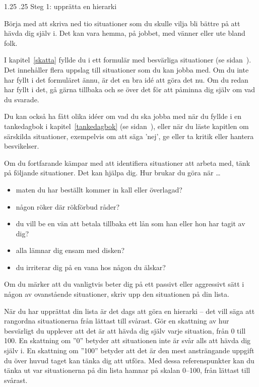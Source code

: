 \documentclass[swedish,a4paper]{book}
\makeatletter
\renewcommand\section{\@startsection{section}{1}{\z@}%
                                   {1.25\baselineskip}%
                                   {.25\baselineskip}%
                                   {\fontsize{1.25\baselineskip}{1.25\baselineskip}\selectfont\sffamily\bfseries}} %
\makeatother
\begin{document}
\section{Steg 1: upprätta en hierarki}

Börja med att skriva ned tio situationer som du skulle vilja bli bättre på att hävda dig själv i. Det kan vara hemma, på jobbet, med vänner eller ute bland folk.

I kapitel~\ref{skatta} fyllde du i ett formulär med besvärliga situationer (se sidan~\pageref{exercise1}). Det innehåller flera uppslag till situationer som du kan jobba med. Om du inte har fyllt i det formuläret ännu, är det en bra idé att göra det nu. Om du redan har fyllt i det, gå gärna tillbaka och se över det för att påminna dig själv om vad du svarade.

Du kan också ha fått olika idéer om vad du ska jobba med när du fyllde i en tankedagbok i kapitel~\ref{tankedagbok} (se sidan~\pageref{tankedagbok}), eller när du läste kapitlen om särskilda situationer, exempelvis om att säga 'nej', ge eller ta kritik eller hantera besvikelser.

Om du fortfarande kämpar med att identifiera situationer att arbeta med, tänk på följande situationer. Det kan hjälpa dig. Hur brukar du göra när \ldots{}

\begin{itemize}

\item maten du har beställt kommer in kall eller överlagad?

\item någon röker där rökförbud råder?

\item du vill be en vän att betala tillbaka ett lån som han eller hon har tagit av dig?

\item alla lämnar dig ensam med disken?

\item du irriterar dig på en vana hos någon du älskar?

\end{itemize}

Om du märker att du vanligtvis beter dig på ett passivt eller aggressivt sätt i någon av ovanstående situationer, skriv upp den situationen på din lista.

När du har upprättat din lista är det dags att göra en hierarki -- det vill säga att rangordna situationerna från lättast till svårast. Gör en skattning av hur besvärligt du upplever att det är att hävda dig själv varje situation, från 0 till 100. En skattning om ''0'' betyder att situationen inte är svår alls att hävda dig själv i. En skattning om ''100'' betyder att det är den mest ansträngande uppgift du över huvud taget kan tänka dig att utföra. Med dessa referenspunkter kan du tänka ut var situationerna på din lista hamnar på skalan 0--100, från lättast till svårast.
\end{document}
